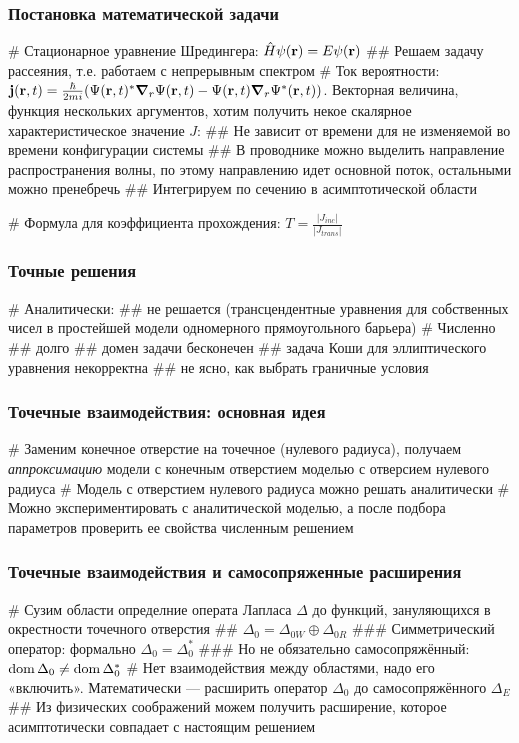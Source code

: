 \documentclass{beamer}
\begin{document}
\begin{frame}[fragile]
\frametitle{Постановка математической задачи}
\begin{easylist}[itemize]
# Стационарное уравнение Шредингера: $\hat{H} \psi(\vb{r}) = E \psi(\vb{r})$
## Решаем задачу рассеяния, т.е. работаем с непрерывным спектром
# Ток вероятности: $\vb{j}(\vb{r}, t) = \frac{\hbar}{2 m i} (\Psi(\vb{r}, t)^* \grad_r{\Psi(\vb{r}, t)} - \Psi(\vb{r}, t) \grad_r{\Psi^*(\vb{r}, t))}$. Векторная величина, функция нескольких аргументов, хотим получить некое скалярное характеристическое значение $J$:
## Не зависит от времени для не изменяемой во времени конфигурации системы
## В проводнике можно выделить направление распространения волны, по этому направлению идет основной поток, остальными можно пренебречь
## Интегрируем по сечению в асимптотической области

# Формула для коэффициента прохождения: $T = \frac{|J_{inc}|}{|J_{trans}|}$
\end{easylist}
\end{frame}


\begin{frame}[fragile]
\frametitle{Точные решения}
\begin{easylist}[itemize]
# Аналитически:
## не решается (трансцендентные уравнения для собственных чисел в простейшей модели одномерного прямоугольного барьера)
# Численно
## долго
## домен задачи бесконечен
## задача Коши для эллиптического уравнения некорректна
## не ясно, как выбрать граничные условия
\end{easylist}
\end{frame}

\begin{frame}[fragile]
\frametitle{Точечные взаимодействия: основная идея}
\begin{easylist}[itemize]
# Заменим конечное отверстие на точечное (нулевого радиуса), получаем \textit{аппроксимацию} модели с конечным отверстием моделью с отверсием нулевого радиуса
# Модель с отверстием нулевого радиуса можно решать аналитически
# Можно экспериментировать с аналитической моделью, а после подбора параметров проверить ее свойства численным решением
\end{easylist}
\end{frame}

\begin{frame}[fragile]
\frametitle{Точечные взаимодействия и самосопряженные расширения}
\begin{easylist}[itemize]
# Сузим области определние операта Лапласа $\Delta$ до функций, зануляющихся в окрестности точечного отверстия
## $\Delta_0 = \Delta_{0W} \oplus \Delta_{0R}$
### Симметрический оператор: формально $\Delta_0 = \Delta_0^*$
### Но не обязательно самосопряжённый:$\operatorname{dom}{\Delta_0} \ne \operatorname{dom}{\Delta_0^*}$
# Нет взаимодействия между областями, надо его «включить». Математически — расширить оператор $\Delta_0$ до самосопряжённого $\Delta_E$
## Из физических соображений можем получить расширение, которое асимптотически совпадает с настоящим решением
\end{easylist}
\end{frame}
\end{document}
